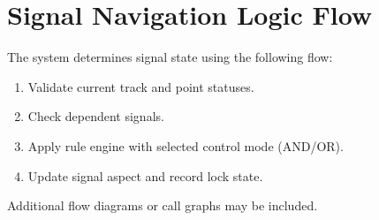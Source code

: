 \section*{Signal Navigation Logic Flow}

The system determines signal state using the following flow:

\begin{enumerate}
  \item Validate current track and point statuses.
  \item Check dependent signals.
  \item Apply rule engine with selected control mode (AND/OR).
  \item Update signal aspect and record lock state.
\end{enumerate}

Additional flow diagrams or call graphs may be included.
